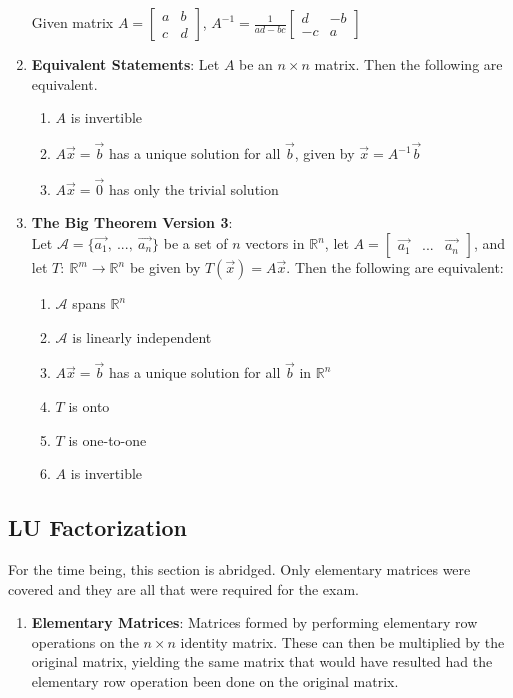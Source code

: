 \documentclass[10pt]{article}
\begin{document}
\begin{enumerate}
Given matrix $A = \begin{bmatrix}
a & b \\ c & d
\end{bmatrix}$, $A^{-1} = \frac{1}{ad-bc}\begin{bmatrix}
d & -b \\ -c & a
\end{bmatrix}$
\item \textbf{Equivalent Statements}: Let $A$ be an $n \times n$ matrix. Then the following are equivalent.
\begin{enumerate}
\item $A$ is invertible
\item $A\vec{x} = \vec{b}$ has a unique solution for all $\vec{b}$, given by $\vec{x} = A^{-1}\vec{b}$
\item $A\vec{x} = \vec{0}$ has only the trivial solution
\end{enumerate}
\item \textbf{The Big Theorem Version 3}: \\
Let $\mathcal{A} = \lbrace \vec{a_1},\ ...,\ \vec{a_n} \rbrace$ be a set of $n$ vectors in $\mathbb{R}^n$,  let $A = \begin{bmatrix}
\vec{a_1} & ... & \vec{a_n}
\end{bmatrix}$, and let $T:\ \mathbb{R}^m \rightarrow \mathbb{R}^n$ be given by $T(\vec{x}) = A\vec{x}$. Then the following are equivalent:
\begin{enumerate}
\item $\mathcal{A}$ spans $\mathbb{R}^n$
\item $\mathcal{A}$ is linearly independent
\item $A\vec{x} = \vec{b}$ has a unique solution for all $\vec{b}$ in $\mathbb{R}^n$
\item $T$ is onto
\item $T$ is one-to-one
\item $A$ is invertible
\end{enumerate}
\end{enumerate}
\subsection{LU Factorization}
For the time being, this section is abridged. Only elementary matrices were covered and they are all that were required for the exam.
\begin{enumerate}
\item \textbf{Elementary Matrices}: Matrices formed by performing elementary row operations on the $n \times n$ identity matrix. These can then be multiplied by the original matrix, yielding the same matrix that would have resulted had the elementary row operation been done on the original matrix.
\end{enumerate}
\end{document}
